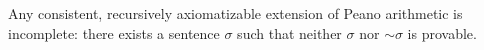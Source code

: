 Any consistent, recursively axiomatizable extension of Peano arithmetic is incomplete: there exists a sentence $\sigma$ such that neither $\sigma$ nor $\sim\sigma$ is provable.
